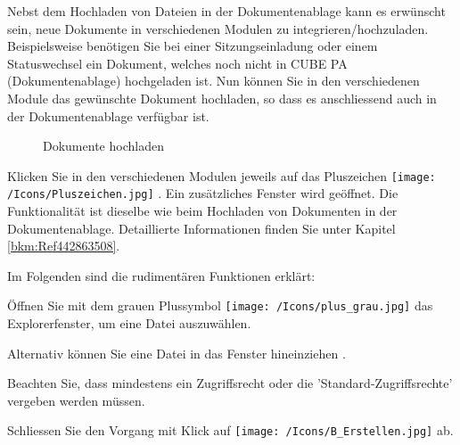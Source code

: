 \vspace{\baselineskip}

Nebst dem Hochladen von Dateien in der Dokumentenablage kann es erwünscht sein, neue Dokumente in verschiedenen Modulen zu integrieren/hochzuladen. Beispielsweise benötigen Sie bei einer Sitzungseinladung oder einem Statuswechsel ein Dokument, welches noch nicht in CUBE PA (Dokumentenablage) hochgeladen ist. Nun können Sie in den verschiedenen Module das gewünschte Dokument hochladen, so dass es anschliessend auch in der Dokumentenablage verfügbar ist.

\begin{figure}[H]
\caption{Dokumente hochladen}
\end{figure}

Klicken Sie in den verschiedenen Modulen jeweils auf das Pluszeichen \texttt{[image: /Icons/Pluszeichen.jpg]} . Ein zusätzliches Fenster wird geöffnet. Die Funktionalität ist dieselbe wie beim Hochladen von Dokumenten in der Dokumentenablage. Detaillierte Informationen finden Sie unter Kapitel \ref{bkm:Ref442863508}.

\vspace{\baselineskip}

Im Folgenden sind die rudimentären Funktionen erklärt:\\

\begin{compactitem}
	\item Öffnen Sie mit dem grauen Plussymbol \texttt{[image: /Icons/plus\_grau.jpg]}  das Explorerfenster, um eine Datei auszuwählen.
	\item Alternativ können Sie eine Datei in das Fenster hineinziehen .
	\item Beachten Sie, dass mindestens ein Zugriffsrecht oder die 'Standard-Zugriffsrechte' vergeben werden müssen.
	\item Schliessen Sie den Vorgang mit Klick auf \texttt{[image: /Icons/B\_Erstellen.jpg]}  ab.
\end{compactitem}

